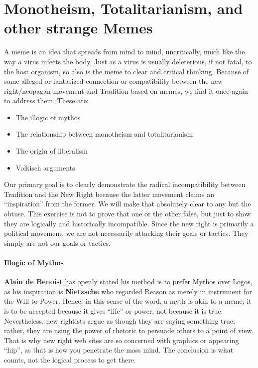 \section{Monotheism, Totalitarianism, and other strange Memes}

A meme is an idea that spreads from mind to mind, uncritically, much like the way a virus infects the body. Just as a virus is usually deleterious, if not fatal, to the host organism, so also is the meme to clear and critical thinking. Because of some alleged or fantasized connection or compatibility between the new right/neopagan movement and Tradition based on memes, we find it once again to address them. These are:

\begin{itemize}


\item The illogic of mythos

\item The relationship between monotheism and totalitarianism

\item The origin of liberalism

\item Volkisch arguments
\end{itemize}


Our primary goal is to clearly demonstrate the radical incompatibility between Tradition and the New Right because the latter movement claims an ``inspiration'' from the former. We will make that absolutely clear to any but the obtuse. This exercise is not to prove that one or the other false, but just to show they are logically and historically incompatible. Since the new right is primarily a political movement, we are not necessarily attacking their goals or tactics. They simply are not our goals or tactics.

\paragraph{Illogic of Mythos}


\textbf{Alain de Benoist} has openly stated his method is to prefer Mythos over Logos, as his inspiration is \textbf{Nietzsche} who regarded Reason as merely in instrument for the Will to Power. Hence, in this sense of the word, a myth is akin to a meme; it is to be accepted because it gives ``life'' or power, not because it is true. Nevertheless, new rightists argue as though they are saying something true; rather, they are using the power of rhetoric to persuade others to a point of view. That is why new right web sites are so concerned with graphics or appearing ``hip'', as that is how you penetrate the mass mind. The conclusion is what counts, not the logical process to get there.

